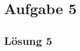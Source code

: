 \documentclass[main.tex]{subfiles}
\begin{document}
\section{Aufgabe 5}

\subsection{Lösung 5}
\end{document}
